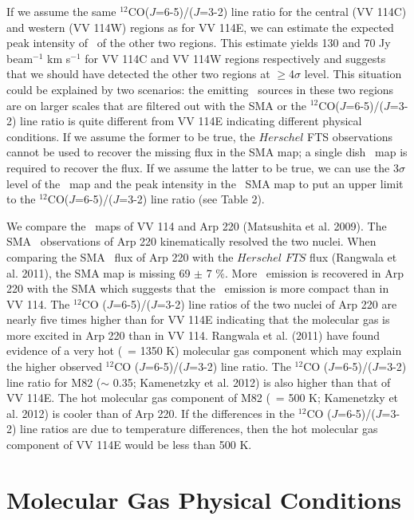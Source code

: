 If we assume the same $^{12}$CO($J$=6-5)/($J$=3-2) line ratio for the central (VV 114C) and western (VV 114W) regions as for VV 114E, we can estimate the expected peak intensity of \cosix\ of the other two regions. This estimate yields 130 and 70 Jy beam$^{-1}$ km s$^{-1}$ for VV 114C and VV 114W regions respectively and suggests that we should have detected the other two regions at $\geq$4$\sigma$ level. This situation could be explained by two scenarios: the emitting \cosix\ sources in these two regions are on larger scales that are filtered out with the SMA or the $^{12}$CO($J$=6-5)/($J$=3-2) line ratio is quite different from VV 114E indicating different physical conditions. If we assume the former to be true, the $Herschel$ FTS observations cannot be used to recover the missing flux in the SMA map; a single dish \cosix\ map is required to recover the flux. If we assume the latter to be true, we can use the 3$\sigma$ level of the \cosix\ map and the peak intensity in the \cothree\ SMA map to put an upper limit to the $^{12}$CO($J$=6-5)/($J$=3-2) line ratio (see Table 2). 

We compare the \cosix\ maps of VV 114 and Arp 220 (Matsushita et al. 2009). The SMA \cosix\ observations of Arp 220 kinematically resolved the two nuclei. When comparing the SMA \cosix\ flux of Arp 220 with the $Herschel$ $FTS$ flux (Rangwala et al. 2011), the SMA map is missing 69 $\pm$ 7 $\%$. More \cosix\ emission is recovered in Arp 220 with the SMA which suggests that the \cosix\ emission is more compact than in VV 114.  The $^{12}$CO ($J$=6-5)/($J$=3-2) line ratios of the two nuclei of Arp 220 are nearly five times higher than for VV 114E indicating that the molecular gas is more excited in Arp 220 than in VV 114. Rangwala et al. (2011) have found evidence of a very hot (\tkin\ = 1350 K)  molecular gas component which may explain the higher observed $^{12}$CO ($J$=6-5)/($J$=3-2) line ratio.  The $^{12}$CO ($J$=6-5)/($J$=3-2) line ratio for M82 ($\sim$ 0.35; Kamenetzky et al. 2012) is also higher than that of VV 114E. The hot molecular gas component of M82 (\tkin\ = 500 K; Kamenetzky et al. 2012) is cooler than of Arp 220. If the differences in the  $^{12}$CO ($J$=6-5)/($J$=3-2) line ratios are due to temperature differences, then the hot molecular gas component of VV 114E would be less than 500 K. 


\section{Molecular Gas Physical Conditions}%
